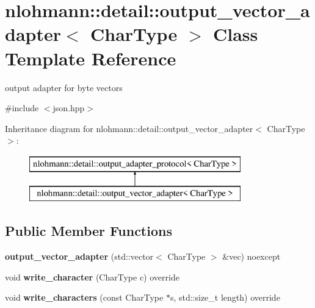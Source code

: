\hypertarget{classnlohmann_1_1detail_1_1output__vector__adapter}{}\section{nlohmann\+:\+:detail\+:\+:output\+\_\+vector\+\_\+adapter$<$ Char\+Type $>$ Class Template Reference}
\label{classnlohmann_1_1detail_1_1output__vector__adapter}


output adapter for byte vectors  




{\ttfamily \#include $<$json.\+hpp$>$}

Inheritance diagram for nlohmann\+:\+:detail\+:\+:output\+\_\+vector\+\_\+adapter$<$ Char\+Type $>$\+:\begin{figure}[H]
\begin{center}
\leavevmode
\includegraphics[height=2.000000cm]{classnlohmann_1_1detail_1_1output__vector__adapter}
\end{center}
\end{figure}
\subsection*{Public Member Functions}
\begin{DoxyCompactItemize}
\item 
\mbox{\label{classnlohmann_1_1detail_1_1output__vector__adapter_a9c4fbf88fda356837038ec30a264cd3e}} 
{\bfseries output\+\_\+vector\+\_\+adapter} (std\+::vector$<$ Char\+Type $>$ \&vec) noexcept
\item 
\mbox{\label{classnlohmann_1_1detail_1_1output__vector__adapter_af6a22d4210bb7bc2da66021300ddd6db}} 
void {\bfseries write\+\_\+character} (Char\+Type c) override
\item 
\mbox{\label{classnlohmann_1_1detail_1_1output__vector__adapter_ad6f6c461dec7bedd5359454dc22fc9aa}} 
void {\bfseries write\+\_\+characters} (const Char\+Type $\ast$s, std\+::size\+\_\+t length) override
\end{DoxyCompactItemize}


